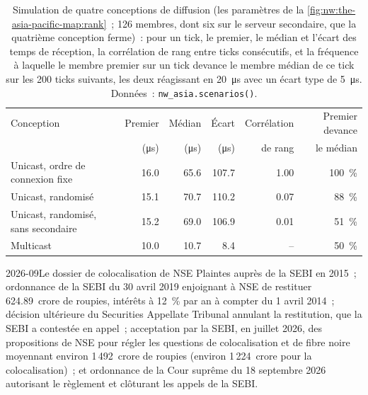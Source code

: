 \begin{table}[ht]
\centering\small
\begin{tabular}{lrrrrr}
\toprule
Conception & Premier & Médian & Écart & Corrélation & Premier devance \\
 & (\si{\micro\second}) & (\si{\micro\second}) & (\si{\micro\second}) & de rang & le médian \\
\midrule
Unicast, ordre de connexion fixe & 16.0 & 65.6 & 107.7 & 1.00 & 100~\% \\
Unicast, randomisé & 15.1 & 70.7 & 110.2 & 0.07 & 88~\% \\
Unicast, randomisé, sans secondaire & 15.2 & 69.0 & 106.9 & 0.01 & 51~\% \\
Multicast & 10.0 & 10.7 & 8.4 & -- & 50~\% \\
\bottomrule
\end{tabular}
\caption{Simulation de quatre conceptions de diffusion (les paramètres de la \cref{fig:nw:the-asia-pacific-map:rank}~; 126 membres, dont six sur le serveur
secondaire, que la quatrième conception ferme)~: pour un tick, le premier, le médian et l'écart des temps de réception, la corrélation de rang entre
ticks consécutifs, et la fréquence à laquelle le membre premier sur un tick devance le membre médian de ce tick sur les 200 ticks suivants, les deux réagissant en
\qty{20}{\micro\second} avec un écart type de \qty{5}{\micro\second}. Données~: \texttt{nw\_asia.scenarios()}.}\label{tab:nw:the-asia-pacific-map:designs}
\end{table}

\label{lst:nw:the-asia-pacific-map:designs}

\begin{dated}{2026-09}{Le dossier de colocalisation de NSE}\label{dat:nw:the-asia-pacific-map:case}
Plaintes auprès de la SEBI en 2015~; ordonnance de la SEBI du 30 avril 2019 enjoignant à NSE de restituer 624.89~crore de roupies, intérêts à 12~\% par an
à compter du 1 avril 2014~; décision ultérieure du Securities Appellate Tribunal annulant la restitution, que la SEBI a contestée en appel~; acceptation
par la SEBI, en juillet 2026, des propositions de NSE pour régler les questions de colocalisation et de fibre noire moyennant environ 1\,492~crore de roupies
(environ 1\,224~crore pour la colocalisation)~; et ordonnance de la Cour suprême du 18 septembre 2026 autorisant le règlement et clôturant les appels de la SEBI.
\end{dated}

